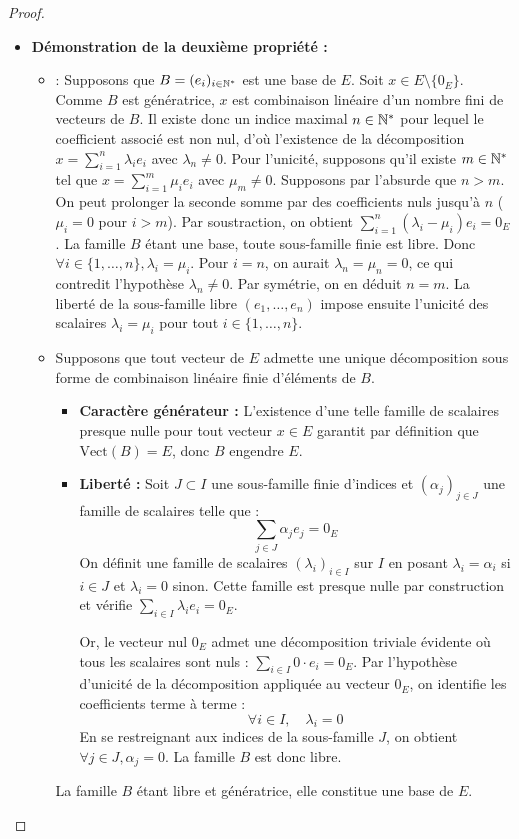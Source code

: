 \documentclass[12pt, a4paper]{report}
\begin{document}
\begin{proof}
\begin{itemize}
        \item \textbf{Démonstration de la deuxième propriété :}
        \begin{itemize}
            \item[$\implies$] : Supposons que $B = (e_i)_{i \in \mathbb{N}^*}$ est une base de $E$. Soit $x \in E \setminus \{0_E\}$. Comme $B$ est génératrice, $x$ est combinaison linéaire d'un nombre fini de vecteurs de $B$. Il existe donc un indice maximal $n \in \mathbb{N}^*$ pour lequel le coefficient associé est non nul, d'où l'existence de la décomposition $x = \sum_{i=1}^n \lambda_i e_i$ avec $\lambda_n \neq 0$. 
            Pour l'unicité, supposons qu'il existe $m \in \mathbb{N}^*$ tel que $x = \sum_{i=1}^m \mu_i e_i$ avec $\mu_m \neq 0$. Supposons par l'absurde que $n > m$. On peut prolonger la seconde somme par des coefficients nuls jusqu'à $n$ ($\mu_i = 0$ pour $i > m$). Par soustraction, on obtient $\sum_{i=1}^n (\lambda_i - \mu_i) e_i = 0_E$. La famille $B$ étant une base, toute sous-famille finie est libre. Donc $\forall i \in \{1,\dots,n\}, \lambda_i = \mu_i$. Pour $i = n$, on aurait $\lambda_n = \mu_n = 0$, ce qui contredit l'hypothèse $\lambda_n \neq 0$. Par symétrie, on en déduit $n = m$. La liberté de la sous-famille libre $(e_1,\dots,e_n)$ impose ensuite l'unicité des scalaires $\lambda_i = \mu_i$ pour tout $i \in \{1,\dots,n\}$.
            \item[$\impliedby$] Supposons que tout vecteur de $E$ admette une unique décomposition sous forme de combinaison linéaire finie d'éléments de $B$.
            \begin{itemize}
                \item \textbf{Caractère générateur :} L'existence d'une telle famille de scalaires presque nulle pour tout vecteur $x \in E$ garantit par définition que $\text{Vect}(B) = E$, donc $B$ engendre $E$.
                
                \item \textbf{Liberté :} Soit $J \subset I$ une sous-famille finie d'indices et $(\alpha_j)_{j \in J}$ une famille de scalaires telle que :
                \[ \sum_{j \in J} \alpha_j e_j = 0_E \]
                On définit une famille de scalaires $(\lambda_i)_{i \in I}$ sur $I$ en posant $\lambda_i = \alpha_i$ si $i \in J$ et $\lambda_i = 0$ sinon. Cette famille est presque nulle par construction et vérifie $\sum_{i \in I} \lambda_i e_i = 0_E$.
                
                Or, le vecteur nul $0_E$ admet une décomposition triviale évidente où tous les scalaires sont nuls : $\sum_{i \in I} 0 \cdot e_i = 0_E$. Par l'hypothèse d'unicité de la décomposition appliquée au vecteur $0_E$, on identifie les coefficients terme à terme :
                \[ \forall i \in I, \quad \lambda_i = 0 \]
                En se restreignant aux indices de la sous-famille $J$, on obtient $\forall j \in J, \alpha_j = 0$. La famille $B$ est donc libre.
            \end{itemize}
            La famille $B$ étant libre et génératrice, elle constitue une base de $E$.
        \end{itemize}
    \end{itemize}
\end{proof}
\end{document}
